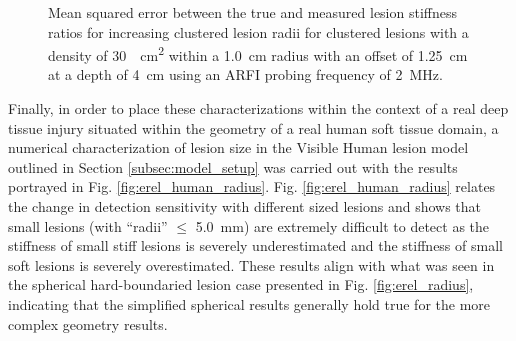 			\begin{figure}[!htb]
				\centering
				\caption[Shear-wave speed quantified mean squared error related to small lesion cluster density]{Mean squared error between the true and measured lesion stiffness ratios for increasing clustered lesion radii for clustered lesions with a density of \SI{30}{\per\cm\squared} within a \SI{1.0}{cm} radius with an offset of \SI{1.25}{\cm} at a depth of \SI{4}{\cm} using an ARFI probing frequency of \SI{2}{\MHz}.}
				\label{fig:erel_cluster_radius_mse}
			\end{figure}

			Finally, in order to place these characterizations within the context of a real deep tissue injury situated within the geometry of a real human soft tissue domain, a numerical characterization of lesion size in the Visible Human lesion model outlined in Section \ref{subsec:model_setup} was carried out with the results portrayed in Fig. \ref{fig:erel_human_radius}. Fig. \ref{fig:erel_human_radius} relates the change in detection sensitivity with different sized lesions and shows that small lesions (with ``radii'' $\leq$ \SI{5.0}{\mm}) are extremely difficult to detect as the stiffness of small stiff lesions is severely underestimated and the stiffness of small soft lesions is severely overestimated. These results align with what was seen in the spherical hard-boundaried lesion case presented in Fig. \ref{fig:erel_radius}, indicating that the simplified spherical results generally hold true for the more complex geometry results.

